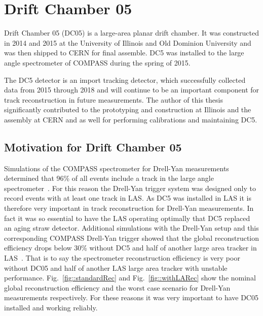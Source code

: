 \chapter{Drift Chamber 05} \label{ch::dc05}
\ifpdf
\graphicspath{{Chapters/DC5/Figs/}}
\fi

Drift Chamber 05 (DC05) is a large-area planar drift chamber.  It was
constructed in 2014 and 2015 at the University of Illinois and Old Dominion
University and was then shipped to CERN for final assemble.  DC5 was installed
to the large angle spectrometer of COMPASS during the spring of 2015.

The DC5 detector is an import tracking detector, which successfully collected
data from 2015 through 2018 and will continue to be an important component for
track reconstruction in future measurements.  The author of this thesis
significantly contributed to the prototyping and construction at Illinois and
the assembly at CERN and as well for performing calibrations and maintaining
DC5.


\section{Motivation for Drift Chamber 05}

Simulations of the COMPASS spectrometer for Drell-Yan measurements determined
that 96\% of all events include a track in the large angle
spectrometer~\cite{proposal}.  For this reason the Drell-Yan trigger system was
designed only to record events with at least one track in LAS.  As DC5 was
installed in LAS it is therefore very important in track reconstruction for
Drell-Yan measurements.  In fact it was so essential to have the LAS operating
optimally that DC5 replaced an aging straw detector.  Additional
simulations with the Drell-Yan setup and this corresponding COMPASS Drell-Yan
trigger showed that the global reconstruction efficiency drops below 30\%
without DC5 and half of another large area tracker in
LAS~\cite{quintans_rec_march12}.  That is to say the spectrometer reconstruction
efficiency is very poor without DC05 and half of another LAS large area tracker
with unstable performance.  Fig.~\ref{fig::standardRec} and
Fig.~\ref{fig::withLARec} show the nominal global reconstruction efficiency and
the worst case scenario for Drell-Yan measurements respectively.  For these
reasons it was very important to have DC05 installed and working reliably.

